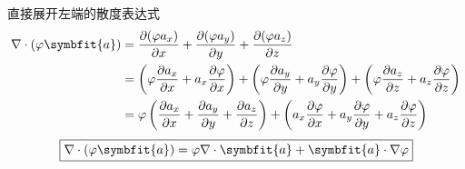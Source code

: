 \begin{myproof}
    直接展开左端的散度表达式
    \begin{equation}
        \begin{aligned}
            \nabla \cdot (\varphi \symbfit{a}) & = \frac{\partial (\varphi a_x)}{\partial x} + \frac{\partial (\varphi a_y)}{\partial y} + \frac{\partial (\varphi a_z)}{\partial z}                                                                                                                                                                      \\
                                               & = \left( \varphi \frac{\partial a_x}{\partial x} + a_x \frac{\partial \varphi}{\partial x} \right) + \left( \varphi \frac{\partial a_y}{\partial y} + a_y \frac{\partial \varphi}{\partial y} \right) + \left( \varphi \frac{\partial a_z}{\partial z} + a_z \frac{\partial \varphi}{\partial z} \right) \\
                                               & = \varphi \left( \frac{\partial a_x}{\partial x} + \frac{\partial a_y}{\partial y} + \frac{\partial a_z}{\partial z} \right) + \left( a_x \frac{\partial \varphi}{\partial x} + a_y \frac{\partial \varphi}{\partial y} + a_z \frac{\partial \varphi}{\partial z} \right)
        \end{aligned}
    \end{equation}
    \begin{equation}
        \boxed{\nabla \cdot (\varphi \symbfit{a}) = \varphi \nabla \cdot \symbfit{a} + \symbfit{a} \cdot \nabla \varphi}
    \end{equation}



\end{myproof}
